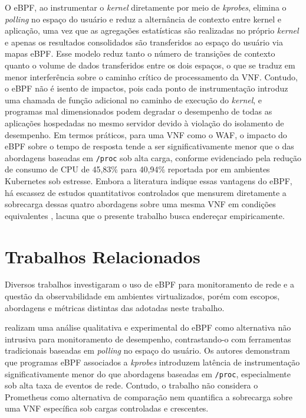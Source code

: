 O eBPF, ao instrumentar o \textit{kernel} diretamente por meio de \textit{kprobes}, elimina o \textit{polling} no espaço do usuário e reduz a alternância de contexto entre kernel e aplicação, uma vez que as agregações estatísticas são realizadas no próprio \textit{kernel} e apenas os resultados consolidados são transferidos ao espaço do usuário via mapas eBPF. Esse modelo reduz tanto o número de transições de contexto quanto o volume de dados transferidos entre os dois espaços, o que se traduz em menor interferência sobre o caminho crítico de processamento da VNF. Contudo, o eBPF não é isento de impactos, pois cada ponto de instrumentação introduz uma chamada de função adicional no caminho de execução do \textit{kernel}, e programas mal dimensionados podem degradar o desempenho de todas as aplicações hospedadas no mesmo servidor devido à violação do isolamento de desempenho. Em termos práticos, para uma VNF como o WAF, o impacto do eBPF sobre o tempo de resposta tende a ser significativamente menor que o das abordagens baseadas em \texttt{/proc} sob alta carga, conforme evidenciado pela redução de consumo de CPU de 45,83\% para 40,94\% reportada por  em ambientes Kubernetes sob estresse. Embora a literatura indique essas vantagens do eBPF, há escassez de estudos quantitativos controlados que mensurem diretamente a sobrecarga dessas quatro abordagens sobre uma mesma VNF em condições equivalentes \cite{usman_observability_2022}, lacuna que o presente trabalho busca endereçar empiricamente.


\section{Trabalhos Relacionados}
\label{sec:trabalhos_relacionados}

Diversos trabalhos investigaram o uso de eBPF para monitoramento de rede e a questão da observabilidade em ambientes virtualizados, porém com escopos, abordagens e métricas distintas das adotadas neste trabalho.

 realizam uma análise qualitativa e experimental do eBPF como alternativa não intrusiva para monitoramento de desempenho, contrastando-o com ferramentas tradicionais baseadas em \textit{polling} no espaço do usuário. Os autores demonstram que programas eBPF associados a \textit{kprobes} introduzem latência de instrumentação significativamente menor do que abordagens baseadas em \texttt{/proc}, especialmente sob alta taxa de eventos de rede. Contudo, o trabalho não considera o Prometheus como alternativa de comparação nem quantifica a sobrecarga sobre uma VNF específica sob cargas controladas e crescentes.

